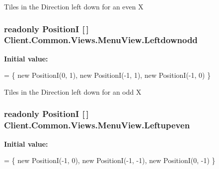 Tiles in the Direction left down for an even X 

\hypertarget{classClient_1_1Common_1_1Views_1_1MenuView_a0a5f7440839d47bbd716627bd0efc576}{}
\subsubsection[{Leftdownodd}]{\setlength{\rightskip}{0pt plus 5cm}readonly {\bf Position\+I} \mbox{[}$\,$\mbox{]} Client.\+Common.\+Views.\+Menu\+View.\+Leftdownodd\hspace{0.3cm}{\ttfamily [static]}}\label{classClient_1_1Common_1_1Views_1_1MenuView_a0a5f7440839d47bbd716627bd0efc576}
{\bfseries Initial value\+:}
\begin{DoxyCode}
=
            \{
                \textcolor{keyword}{new} PositionI(0, 1),
                \textcolor{keyword}{new} PositionI(-1, 1),
                \textcolor{keyword}{new} PositionI(-1, 0)
            \}
\end{DoxyCode}


Tiles in the Direction left down for an odd X 

\hypertarget{classClient_1_1Common_1_1Views_1_1MenuView_a89a9af01e575d4fd95b93697fd1c21da}{}
\subsubsection[{Leftupeven}]{\setlength{\rightskip}{0pt plus 5cm}readonly {\bf Position\+I} \mbox{[}$\,$\mbox{]} Client.\+Common.\+Views.\+Menu\+View.\+Leftupeven\hspace{0.3cm}{\ttfamily [static]}}\label{classClient_1_1Common_1_1Views_1_1MenuView_a89a9af01e575d4fd95b93697fd1c21da}
{\bfseries Initial value\+:}
\begin{DoxyCode}
=
            \{
                \textcolor{keyword}{new} PositionI(-1, 0),
                \textcolor{keyword}{new} PositionI(-1, -1),
                \textcolor{keyword}{new} PositionI(0, -1)
            \}
\end{DoxyCode}


